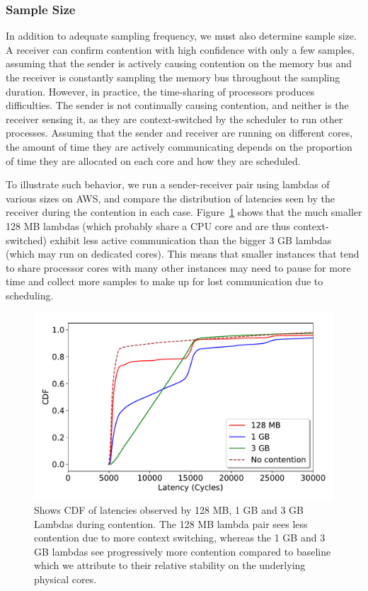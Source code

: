 \subsubsection{Sample Size} 
\label{sec:method:samplingdur}
In addition to adequate sampling frequency, we must also determine sample size.  
A receiver can confirm contention with high confidence with only a
few samples, assuming that the sender is actively causing contention on the
memory bus and the receiver is constantly sampling the memory bus throughout the
sampling duration.  However, in practice, the time-sharing of processors
produces difficulties.  The sender is not continually causing contention, and
neither is the receiver sensing it, as they are context-switched by the
scheduler to run other processes.  Assuming that the sender and receiver are
running on different cores, the amount of time they are actively communicating
depends on the proportion of time they are allocated on each core and how they
are scheduled. 

To illustrate such behavior, we run a sender-receiver pair using
lambdas\cite{awslambda} of various sizes on AWS, and compare the distribution of
latencies seen by the receiver during the contention in each case.
Figure~\ref{fig:context_switching} shows that the much smaller 128 MB lambdas
(which probably share a CPU core and are thus context-switched) exhibit less
active communication than the bigger 3 GB lambdas (which may run on dedicated
cores).  This means that smaller instances that tend to share processor cores
with many other instances may need to pause for more time and collect more
samples to make up for lost communication due to scheduling.


\begin{figure}[!t]
  \includegraphics[width=.99\linewidth]{fig/lambda_sched_effect.pdf}
  \caption{Shows CDF of latencies observed by 128 MB, 1 GB and 3 GB Lambdas during 
  contention. The 128 MB lambda pair sees less contention due to more context switching, 
  whereas the 1 GB and 3 GB lambdas see progressively more contention compared to baseline 
  which we attribute to their relative stability on the underlying physical cores. 
\label{fig:context_switching}}
\end{figure}


